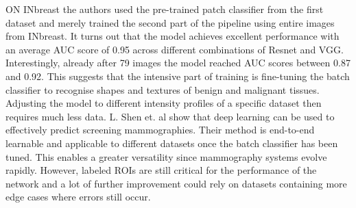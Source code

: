 ON INbreast the authors used the pre-trained patch classifier from the first dataset and merely trained the second part of the pipeline using entire images from INbreast. It turns out that the model achieves excellent performance with an average AUC score of 0.95 across different combinations of Resnet and VGG. Interestingly, already after 79 images the model reached AUC scores between 0.87 and 0.92. This suggests that the intensive part of training is fine-tuning the batch classifier to recognise shapes and textures of benign and malignant tissues. Adjusting the model to different intensity profiles of a specific dataset then requires much less data.
\newline
\newline
L. Shen et. al show that deep learning can be used to effectively predict screening mammographies. Their method is end-to-end learnable and applicable to different datasets once the batch classifier has been tuned. This enables a greater versatility since mammography systems evolve rapidly. However, labeled ROIs are still critical for the performance of the network and a lot of further improvement could rely on datasets containing more edge cases where errors still occur. 
